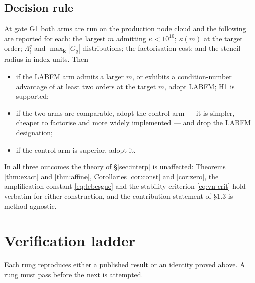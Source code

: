 \documentclass[11pt,a4paper]{article}
\begin{document}
\subsection{Decision rule}
\label{sec:decision}

At gate G1 both arms are run on the production node cloud and the following are
reported for each: the largest $m$ admitting $\kappa<10^{10}$; $\kappa(m)$ at the
target order; $\Lambda^{q}_i$ and $\max_{\bm k}|G_q|$ distributions; the factorisation
cost; and the stencil radius in index units. Then
\begin{itemize}
\item if the LABFM arm admits a larger $m$, or exhibits a condition-number advantage of
at least two orders at the target $m$, adopt LABFM; H1 is supported;
\item if the two arms are comparable, adopt the control arm --- it is simpler, cheaper
to factorise and more widely implemented --- and drop the LABFM designation;
\item if the control arm is superior, adopt it.
\end{itemize}
In all three outcomes the theory of \S\ref{sec:interp} is unaffected: Theorems
\ref{thm:exact} and \ref{thm:affine}, Corollaries \ref{cor:const} and \ref{cor:zero},
the amplification constant \eqref{eq:lebesgue} and the stability criterion
\eqref{eq:vn-crit} hold verbatim for either construction, and the contribution
statement of \S1.3 is method-agnostic.

\section{Verification ladder}
\label{sec:ladder}

Each rung reproduces either a published result or an identity proved above. A rung must
pass before the next is attempted.
\end{document}
